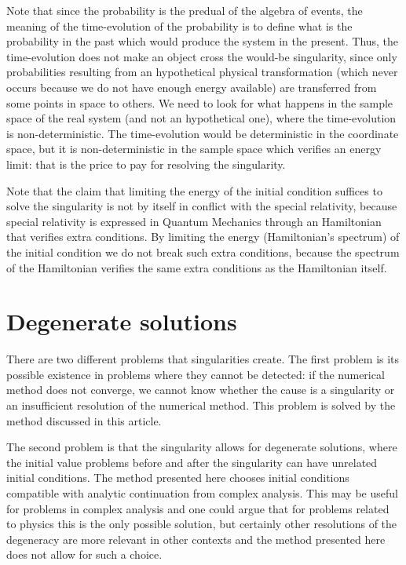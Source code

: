 \documentclass[11pt]{book}
\begin{document}
Note that since the probability is the predual of the algebra of events,
the meaning of the time-evolution of the probability is to define what
is the probability in the past which would produce the system in the
present. Thus, the time-evolution does not make an object cross the
would-be singularity, since only probabilities resulting from an
hypothetical physical transformation (which never occurs because we do
not have enough energy available) are transferred from some points in
space to others. We need to look for what happens in the sample space of
the real system (and not an hypothetical one), where the time-evolution
is non-deterministic. The time-evolution would be deterministic in the
coordinate space, but it is non-deterministic in the sample space which
verifies an energy limit: that is the price to pay for resolving the
singularity.

Note that the claim that limiting the energy of the initial condition
suffices to solve the singularity is not by itself in conflict with the
special relativity, because special relativity is expressed in Quantum
Mechanics through an Hamiltonian that verifies extra conditions. By
limiting the energy (Hamiltonian's spectrum) of the initial condition we
do not break such extra conditions, because the spectrum of the
Hamiltonian verifies the same extra conditions as the Hamiltonian
itself.

\hypertarget{degenerate-solutions}{%
\section{Degenerate solutions}\label{degenerate-solutions}}

There are two different problems that singularities create. The first
problem is its possible existence in problems where they cannot be
detected: if the numerical method does not converge, we cannot know
whether the cause is a singularity or an insufficient resolution of the
numerical method. This problem is solved by the method discussed in this
article.

The second problem is that the singularity allows for degenerate
solutions, where the initial value problems before and after the
singularity can have unrelated initial conditions. The method presented
here chooses initial conditions compatible with analytic continuation
from complex analysis. This may be useful for problems in complex
analysis and one could argue that for problems related to physics this
is the only possible solution, but certainly other resolutions of the
degeneracy are more relevant in other contexts and the method presented
here does not allow for such a choice.
\end{document}
